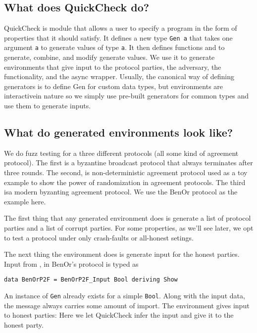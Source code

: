 \subsection{What does QuickCheck do?}
QuickCheck is module that allows a user to specify a program in the form of properties that it should satisfy. 
It defines a new type \texttt{Gen a} that takes one argument \texttt{a} to generate values of type \texttt{a}. 
It then defines functions and to generate, combine, and modify generate values. 
We use it to generate environments that give input to the protocol parties, the adversary, the functionality, and the async wrapper.
Usually, the canonical way of defining generators is to define Gen for custom data types, but environments are interactivein nature so we simply use pre-built generators for common types and use them to generate inputs.

\subsection{What do generated environments look like?}
We do fuzz testing for a three different protocols (all some kind of agreement protocol). 
The first is a byzantine broadcast protocol that always terminates after three rounds. 
The second, is non-deterministic agreement protocol used as a toy example to show the power of randomization in agreement protocols. 
The third isa modern byzanting agreement protocol.
We use the BenOr protocol as the example here. 

The first thing that any generated environment does is generate a list of protocol parties and a list of corrupt parties. For some properties, as we'll see later, we opt to test a protocol under only crash-faults or all-honest setings. 

The next thing the environment does is generate input for the honest parties.
Input from \Z, in BenOr's protocol is typed as
\begin{lstlisting}
data BenOrP2F = BenOrP2F_Input Bool deriving Show
\end{lstlisting}
An instance of \texttt{Gen} already exists for a simple \texttt{Bool}. 
Along with the input data, the message always carries some amount of import.
The environment gives input to honest parties:
Here we let QuickCheck infer the input and give it to the honest party. 

